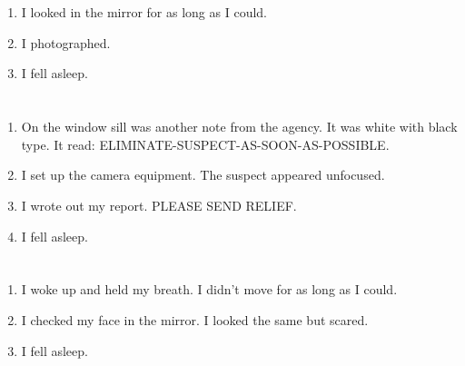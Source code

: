 \documentclass{article}
\begin{document}
    \newpage
    
    \section{}
    
    \begin{enumerate}
    
    \item I looked in the mirror for as long as I could.\\
    
    \item I photographed.\\
    
    \item I fell asleep.\\
    
    \end{enumerate}
     
    \newpage
    
    \section{}
    
    \begin{enumerate}
    
    \item On the window sill was another note from the agency. It was white with black type. It read: ELIMINATE-SUSPECT-AS-SOON-AS-POSSIBLE.\\
    
    \item I set up the camera equipment. The suspect appeared unfocused.\\
    
    \item I wrote out my report. PLEASE SEND RELIEF.\\
    
    \item I fell asleep.\\
    
    \end{enumerate}
     
    \newpage
    
    \section{}
    
    \begin{enumerate}
    
    \item I woke up and held my breath. I didn't move for as long as I could.\\
    
    \item I checked my face in the mirror. I looked the same but scared.\\
    
    \item I fell asleep.\\
    
    \end{enumerate}
     
\end{document}
